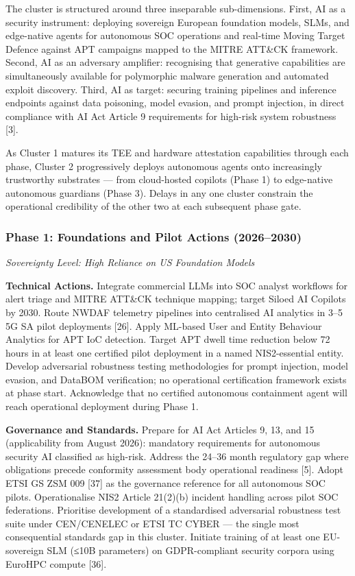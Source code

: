 \documentclass{ieeeaccess}
\begin{document}
The cluster is structured around three inseparable sub-dimensions.
First, AI as a security instrument: deploying sovereign European
foundation models, SLMs, and edge-native agents for autonomous SOC
operations and real-time Moving Target Defence against APT campaigns
mapped to the MITRE ATT\&CK framework. Second, AI as an adversary
amplifier: recognising that generative capabilities are simultaneously
available for polymorphic malware generation and automated exploit
discovery. Third, AI as target: securing training pipelines and
inference endpoints against data poisoning, model evasion, and prompt
injection, in direct compliance with AI Act Article 9 requirements for
high-risk system robustness {[}3{]}.

As Cluster 1 matures its TEE and hardware attestation capabilities
through each phase, Cluster 2 progressively deploys autonomous agents
onto increasingly trustworthy substrates --- from cloud-hosted copilots
(Phase 1) to edge-native autonomous guardians (Phase 3). Delays in any
one cluster constrain the operational credibility of the other two at
each subsequent phase gate.

\subsubsection{Phase 1: Foundations and Pilot Actions
(2026--2030)}\label{phase-1-foundations-and-pilot-actions-20262030-1}

\emph{Sovereignty Level: High Reliance on US Foundation Models}

\textbf{Technical Actions.} Integrate commercial LLMs into SOC analyst
workflows for alert triage and MITRE ATT\&CK technique mapping; target
Siloed AI Copilots by 2030. Route NWDAF telemetry pipelines into
centralised AI analytics in 3--5 5G SA pilot deployments {[}26{]}. Apply
ML-based User and Entity Behaviour Analytics for APT IoC detection.
Target APT dwell time reduction below 72 hours in at least one certified
pilot deployment in a named NIS2-essential entity. Develop adversarial
robustness testing methodologies for prompt injection, model evasion,
and DataBOM verification; no operational certification framework exists
at phase start. Acknowledge that no certified autonomous containment
agent will reach operational deployment during Phase 1.

\textbf{Governance and Standards.} Prepare for AI Act Articles 9, 13,
and 15 (applicability from August 2026): mandatory requirements for
autonomous security AI classified as high-risk. Address the 24--36 month
regulatory gap where obligations precede conformity assessment body
operational readiness {[}5{]}. Adopt ETSI GS ZSM 009 {[}37{]} as the
governance reference for all autonomous SOC pilots. Operationalise NIS2
Article 21(2)(b) incident handling across pilot SOC federations.
Prioritise development of a standardised adversarial robustness test
suite under CEN/CENELEC or ETSI TC CYBER --- the single most
consequential standards gap in this cluster. Initiate training of at
least one EU-sovereign SLM (≤10B parameters) on GDPR-compliant security
corpora using EuroHPC compute {[}36{]}.
\end{document}
